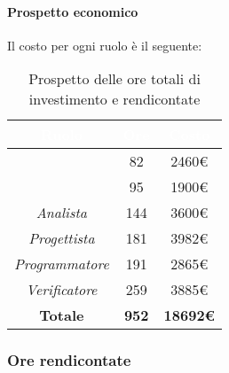\paragraph{Prospetto economico}
Il costo per ogni ruolo è il seguente:
\begin{table}[H]
	\begin{center}
		\begin{tabular}{ |c c c| }
		\rowcolor{darkblue} 
		\textcolor{white}{\textbf{Ruolo}} & \textcolor{white}{\textbf{Ore}} & \textcolor{white}{\textbf{Costo}} \\ \hline
		\textit{\Responsabile} 	& 82 	& 2460€ \\ \hline
		\textit{\Amministratore} 	& 95 	& 1900€ \\ \hline
		\textit{Analista} 		& 144 	& 3600€ \\ \hline
		\textit{Progettista} 	& 181 	& 3982€ \\ \hline
		\textit{Programmatore}  	& 191 	& 2865€ \\ \hline
		\textit{Verificatore} 	& 259 	& 3885€ \\ \hline
		\textbf{Totale} & \textbf{952} & \textbf{18692€} \\  \hline
		\end{tabular}
	\caption{ Prospetto delle ore totali di investimento e rendicontate}
	\end{center}
\end{table}
\subsubsection{Ore rendicontate}
